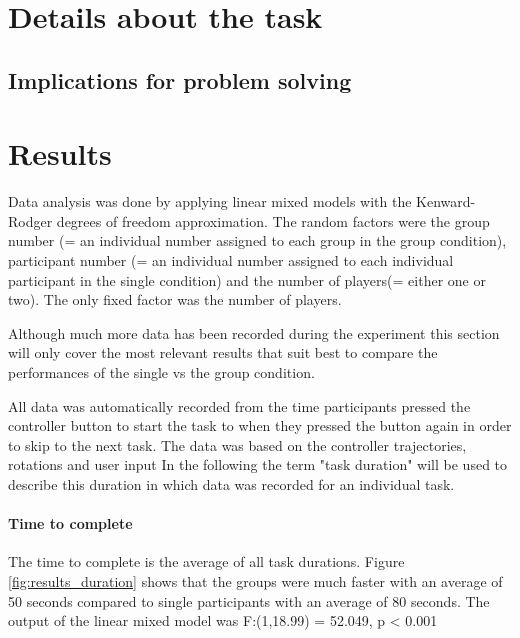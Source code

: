 \documentclass{article}
\begin{document}


\section{Details about the task}

\subsection{Implications for problem solving}

\section{Results}
Data analysis was done by applying linear mixed models with the Kenward-Rodger degrees of freedom approximation. The random factors were the group number (= an individual number assigned to each group in the group condition), participant number (= an individual number assigned to each individual participant in the single condition) and the number of players(= either one or two). The only fixed factor was the number of players. 

 Although much more data has been recorded during the experiment this section will only cover the most relevant results that suit best to compare the performances of the single vs the group condition. 
 
 All data was automatically recorded from the time participants pressed the controller button to start the task to when they pressed the button again in order to skip to the next task. The data was based on the controller trajectories, rotations and user input  In the following the term "task duration" will be used to describe this duration in which data was recorded for an individual task.

\paragraph{Time to complete}
The time to complete is the average of all task durations.  Figure \ref{fig:results_duration} shows that the groups were much faster with an average of 50 seconds compared to single participants with an average of 80 seconds. The output of the linear mixed model was F:(1,18.99) = 52.049, p < 0.001 
\end{document}
